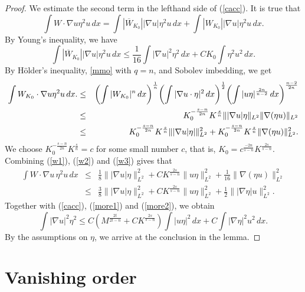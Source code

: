 \documentclass[11pt]{amsart}
\theoremstyle{plain}
\numberwithin{equation}{section}
\begin{document}
\begin{proof}
We estimate the second term in the lefthand side of (\ref{cacc}).
It is true that
\begin{equation}
\int W \cdot \nabla u \eta^2 u\, dx = \int |{\overline{W}_{K_0}}|
|\nabla u| \eta^2 u\, dx+ \int |{W}_{K_0}| | \nabla u| \eta^2 u \, dx.
\label{w1}
\end{equation}
By Young's inequality, we have
\begin{equation}
\int |{\overline{W}_{K_0}}|  |\nabla u| \eta^2 u\, dx\leq \frac{1}{16}
\int |\nabla u|^2\eta^2\,dx +CK_0 \int \eta^2 u^2 \, dx.
\label{w2}
\end{equation}
By H\"older's inequality, \eqref{mmo} with $q=n$, and Sobolev imbedding, we get
\begin{eqnarray}
\int {W}_{K_0} \cdot \nabla u \eta^2 u \, dx.
&\leq & {\left( {\int |{{W}_{K_0}}|^{{n}}\, dx} \right) }^{\frac{1}{n}} {\left( {\int |\nabla u\cdot \eta
|^{2}\, dx} \right) }^{\frac{1}{2}} {\left( {\int |u \eta |^{\frac{2n}{n-2}}\,
dx} \right) }^{\frac{n-2}{2n}}
\nonumber \medskip \\
& \leq & K_0^{-\frac{s-n}{2n}}K^{\frac{s}{n}}\||\nabla
u|\eta\|_{L^2}
\|\nabla(\eta u)\|_{L^2} \nonumber \medskip \\
&\leq & K_0^{-\frac{s-n}{2n}}K^{\frac{s}{n}}\||\nabla
u|\eta|\|^2_{L^2}+K_0^{-\frac{s-n}{2n}}K^{\frac{s}{n}}
\|\nabla(\eta u)\|^2_{L^2}.
\label{w3}
\end{eqnarray}
We choose $K_0^{-\frac{s-n}{2n}}K^{\frac{s}{n}}=c$ for some
small number $c$, that is,
$K_0=c^{\frac{-2n}{s-n}}K^{\frac{2s}{s-n}}$. Combining
(\ref{w1}), (\ref{w2}) and (\ref{w3}) gives that
\begin{eqnarray}
\int W \cdot \nabla u \, \eta^2 u\, dx &\leq& \frac{1}{8} \||\nabla u|
\eta\|^2_{L^2}+CK^{\frac{2s}{s-n}}
\|u\eta\|^2_{L^2}+\frac{1}{16}\|\nabla (\eta
u)\|^2_{L^2} \nonumber \\
&\leq & \frac{3}{8}\||\nabla u|
\eta\|^2_{L^2}+CK^{\frac{2s}{s-n}}
\|u\eta\|^2_{L^2}+\frac{1}{2}\||\nabla \eta| u \|^2_{L^2}.
\label{more2}
\end{eqnarray}
Together with (\ref{cacc}), (\ref{more1}) and (\ref{more2}), we
obtain
\begin{equation*}
\int |\nabla u|^2 \eta^2
\leq C {\left( {M^{\frac{2t}{2t-n}} +CK^{\frac{2s}{s-n}}} \right) } \int |u\eta|^2\,dx+ C \int
|\nabla \eta|^2u^2\,dx.
\end{equation*}
By the assumptions on $\eta$, we arrive at the conclusion in the
lemma.
\end{proof}

\section{Vanishing order}
\label{vanOrd}
\end{document}
